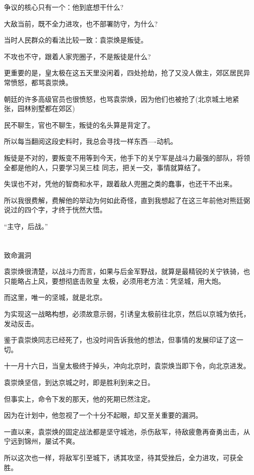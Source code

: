 \documentclass[11pt,a4paper,onecolumn]{article}
\begin{document}
争议的核心只有一个：他到底想干什么?

大敌当前，既不全力进攻，也不部署防守，为什么?

当时人民群众的看法比较一致：袁崇焕是叛徒。

不攻也不守，跟着人家兜圈子，不是叛徒是什么?

更重要的是，皇太极在这五天里没闲着，四处抢劫，抢了又没人做主，郊区居民异常愤怒，都骂袁崇焕。

朝廷的许多高级官员也很愤怒，也骂袁崇焕，因为他们也被抢了(北京城土地紧张，园林别墅都在郊区)

民不聊生，官也不聊生，叛徒的名头算是背定了。

所以每当翻阅这段史料时，我总会寻找一样东西----动机。

叛徒是不对的，要叛变不用等到今天，他手下的关宁军是战斗力最强的部队，将领全都是他的人，只要学习吴三桂
同志，把关一交，事情就算结了。

失误也不对，凭他的智商和水平，跟着敌人兜圈之类的蠢事，也还干不出来。

所以我很费解，费解他的举动为何如此奇怪，直到我想起了在这三年前他对熊廷弼说过的四个字，才终于恍然大悟。

``主守，后战。''

\section[\thesection]{}

致命漏洞

袁崇焕很清楚，以战斗力而言，如果与后金军野战，就算是最精锐的关宁铁骑，也只能略占上风，要想彻底击败皇
太极，必须用老方法：凭坚城，用大炮。

而这里，唯一的坚城，就是北京。

为实现这一战略构想，必须故意示弱，引诱皇太极前往北京，然后以京城为依托，发动反击。

鉴于袁崇焕同志已经死了，也没时间告诉我他的想法，但事情的发展印证了这一切。

十一月十六日，当皇太极终于掉头，冲向北京时，袁崇焕当即下令，向北京进发。

袁崇焕坚信，到达京城之时，即是胜利到来之日。

但事实上，命令下发的那天，他的死期已然注定。

因为在计划中，他忽视了一个十分不起眼，却又至关重要的漏洞。

一直以来，袁崇焕的固定战法都是坚守城池，杀伤敌军，待敌疲惫再奋勇出击，从宁远到锦州，屡试不爽。

所以这次也一样，将敌军引至城下，诱其攻坚，待其受挫后，全力进攻，可获全胜。
\end{document}
